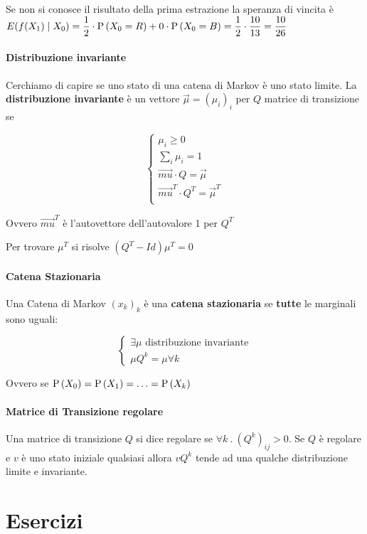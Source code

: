 Se non si conosce il risultato della prima estrazione la speranza di vincita è $ E(f(X_1) \mid X_0)  = \dfrac{1}{2} \cdot \text{P}\left(X_0 = R\right) + 0 \cdot \text{P}\left(X_0 = B\right) = \dfrac{1}{2} \cdot \dfrac{10}{13} = \dfrac{10}{26} $

\paragraph{Distribuzione invariante}

Cerchiamo di capire se uno stato di una catena di Markov è uno stato limite. La \textbf{distribuzione invariante} è un vettore $ \vec{\mu} = (\mu_i)_i $ per $ Q $ matrice di transizione se 

\[ \begin{cases}
\mu_i \geq 0 \\
\sum_i \mu_i = 1 \\
\vec{mu} \cdot Q = \vec{\mu} \\
\vec{mu}^T \cdot Q^T = \vec{\mu}^T \\
\end{cases} \]

Ovvero $ \vec{mu}^T $ è l'autovettore dell'autovalore 1 per $ Q^T $

Per trovare $ \mu^T $ si risolve $(Q^T-Id)\mu^T = 0$

\paragraph{Catena Stazionaria}

Una Catena di Markov $ (x_k)_k $ è una \textbf{catena stazionaria} se \textbf{tutte} le marginali sono uguali:

\[ \begin{cases}
\exists \mu \text{ distribuzione invariante} \\
\mu Q^k = \mu \forall k 
\end{cases} \]

Ovvero se $ \text{P}\left(X_0\right) = \text{P}\left(X_1\right) = \hdots = \text{P}\left(X_k\right) $

\paragraph{Matrice di Transizione regolare}
Una matrice di transizione $ Q $ si dice regolare se $ \forall k \>.\> (Q^k)_{ij} > 0 $. Se $ Q $ è regolare e $ v $ è uno stato iniziale qualsiasi allora $ vQ^k $ tende ad una qualche distribuzione limite e invariante.

\section{Esercizi}

